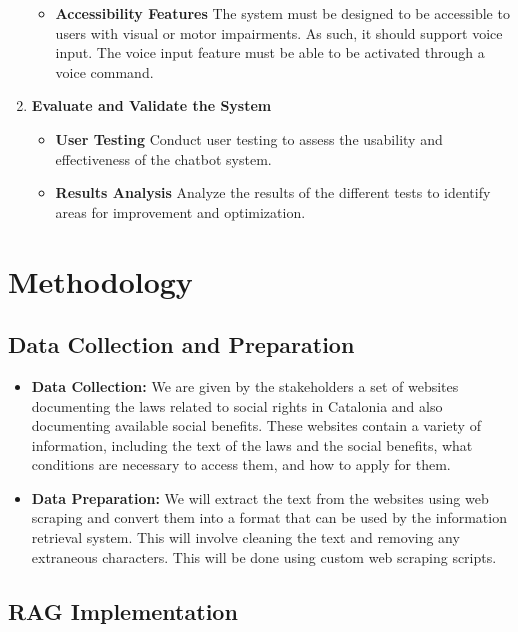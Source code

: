 \documentclass[a4paper,12pt,twoside]{ThesisStyle}
\begin{document}
\begin{enumerate}
\begin{itemize}
          \item \textbf{Accessibility Features} The system must be designed to be accessible to users with visual or motor impairments. As such, it should support voice input. The voice input feature must be able to be activated through a voice command.
        \end{itemize}
  \item \textbf{Evaluate and Validate the System}
        \begin{itemize}
          \item \textbf{User Testing} Conduct user testing to assess the usability and effectiveness of the chatbot system.
          \item \textbf{Results Analysis} Analyze the results of the different tests to identify areas for improvement and optimization.
        \end{itemize}
\end{enumerate}

\chapter{Methodology}
\label{cap:methodology}

\section{Data Collection and Preparation}
\label{sec:data}

\begin{itemize}
  \item \textbf{Data Collection:} We are given by the stakeholders a set of websites documenting the laws related to social rights in Catalonia and also documenting available social benefits. These websites contain a variety of information, including the text of the laws and the social benefits, what conditions are necessary to access them, and how to apply for them.
  \item \textbf{Data Preparation:} We will extract the text from the websites using web scraping and convert them into a format that can be used by the information retrieval system. This will involve cleaning the text and removing any extraneous characters. This will be done using custom web scraping scripts.
\end{itemize}

\section{RAG Implementation}
\label{sec:rag-implementation}
\end{document}
